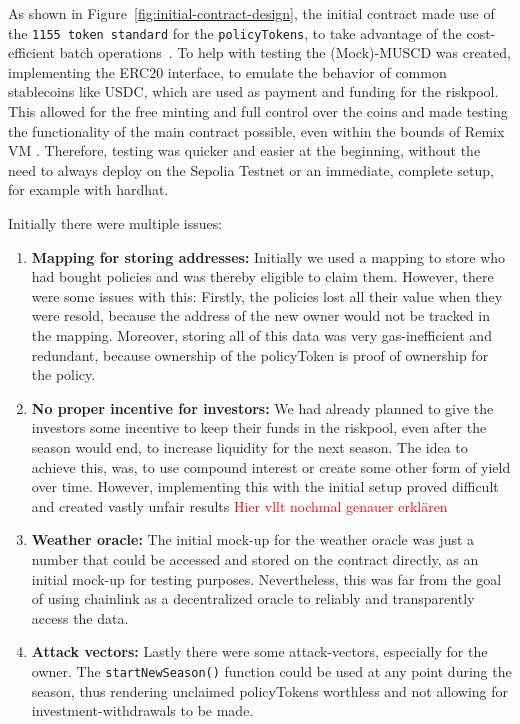 \documentclass[11pt,a4paper]{article}
\begin{document}
    As shown in Figure~\ref{fig:initial-contract-design}, the initial contract made use of the \texttt{1155 token standard} for the \texttt{policyTokens}, to take advantage of the cost-efficient batch operations~\parencite{ERC1155}.
    To help with testing the (Mock)-MUSCD was created, implementing the ERC20 interface, to emulate the behavior of common stablecoins like USDC, which are used as payment and funding for the riskpool.
    This allowed for the free minting and full control over the coins and made testing the functionality of the main contract possible, even within the bounds of Remix VM .
    Therefore, testing was quicker and easier at the beginning, without the need to always deploy on the Sepolia Testnet or an immediate, complete setup, for example with hardhat.

    Initially there were multiple issues:
    \begin{enumerate}[1]
        \item \textbf{Mapping for storing addresses:} Initially we used a mapping to store who had bought policies and was thereby eligible to claim them.
        However, there were some issues with this: Firstly, the policies lost all their value when they were resold, because the address of the new owner would not be tracked in the mapping.
        Moreover, storing all of this data was very gas-inefficient and redundant, because ownership of the policyToken is proof of ownership for the policy.
        \item \textbf{No proper incentive for investors:} We had already planned to give the investors some incentive to keep their funds in the riskpool, even after the season would end, to increase liquidity for the next season.
        The idea to achieve this, was, to use compound interest or create some other form of yield over time.
        However, implementing this with the initial setup proved difficult and created vastly unfair results \textcolor{red}{Hier vllt nochmal genauer erkl\"aren}
        \item \textbf{Weather oracle:} The initial mock-up for the weather oracle was just a number that could be accessed and stored on the contract directly, as an initial mock-up for testing purposes.
        Nevertheless, this was far from the goal of using chainlink as a decentralized oracle to reliably and transparently access the data.
        \item \textbf{Attack vectors:} Lastly there were some attack-vectors, especially for the owner.
        The \texttt{startNewSeason()} function could be used at any point during the season, thus rendering unclaimed policyTokens worthless and not allowing for investment-withdrawals to be made.
    \end{enumerate}
\end{document}
